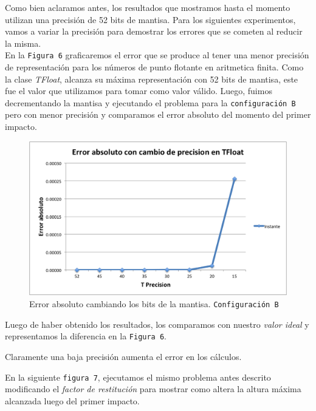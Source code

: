 \documentclass[a4paper]{article}
\begin{document}
Como bien aclaramos antes, los resultados que mostramos hasta el momento utilizan una precisión de 52 bits de mantisa. Para los siguientes experimentos, vamos a variar la precisión para demostrar los errores que se cometen al reducir la misma.\\[1em]


En la \texttt{Figura 6} graficaremos el error que se produce al tener una menor precisión de representación para los números de punto flotante en aritmetica finita. 
Como la clase \textit{TFloat}, alcanza su máxima representación con 52 bits de mantisa, este fue el valor que utilizamos para tomar como valor válido. Luego, fuimos decrementando la mantisa y ejecutando el problema para la \texttt{configuración B} pero con menor precisión y comparamos el error absoluto del momento del primer impacto. \\[1em]

\begin{figure}[H]
  \centering
  \includegraphics[scale=0.75]{graficos/6-errorAbsoluto.png}
  \caption{Error absoluto cambiando los bits de la mantisa. \texttt{Configuración B} }
\end{figure}

Luego de haber obtenido los resultados, los comparamos con nuestro \textit{valor ideal} y representamos la diferencia en la \texttt{Figura 6}.

Claramente una baja precisión aumenta el error en los cálculos.


En la siguiente \texttt{figura 7}, ejecutamos el mismo problema antes descrito modificando el \textit{factor de restitución} para mostrar como altera la altura máxima alcanzada luego del primer impacto.
\end{document}
